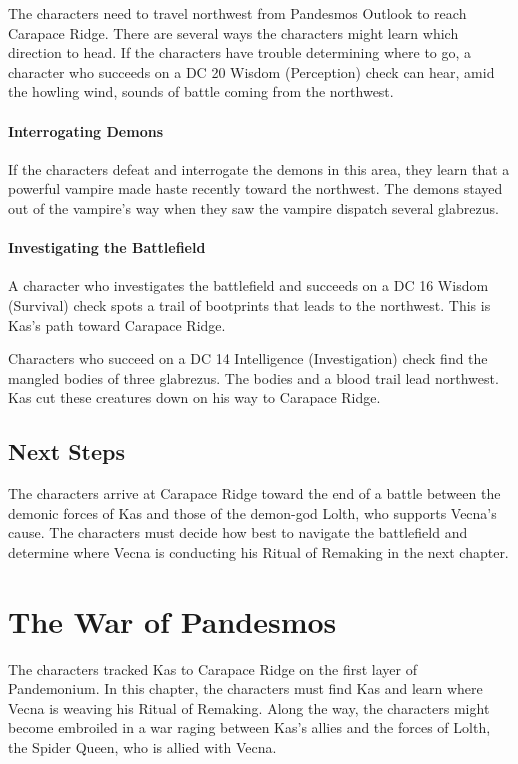 \documentclass[10pt,a4paper,twoside,bg=print,twocolumn,openany,nodeprecatedcode]{dndbook}
\begin{document}
The characters need to travel northwest from Pandesmos Outlook to reach Carapace Ridge. There are several ways the characters might learn which direction to head. If the characters have trouble determining where to go, a character who succeeds on a DC 20 Wisdom (Perception) check can hear, amid the howling wind, sounds of battle coming from the northwest.

\subsubsection{Interrogating Demons}
If the characters defeat and interrogate the demons in this area, they learn that a powerful vampire made haste recently toward the northwest. The demons stayed out of the vampire's way when they saw the vampire dispatch several glabrezus.

\subsubsection{Investigating the Battlefield}
A character who investigates the battlefield and succeeds on a DC 16 Wisdom (Survival) check spots a trail of bootprints that leads to the northwest. This is Kas's path toward Carapace Ridge.

Characters who succeed on a DC 14 Intelligence (Investigation) check find the mangled bodies of three glabrezus. The bodies and a blood trail lead northwest. Kas cut these creatures down on his way to Carapace Ridge.

\section{Next Steps}
The characters arrive at Carapace Ridge toward the end of a battle between the demonic forces of Kas and those of the demon-god Lolth, who supports Vecna's cause. The characters must decide how best to navigate the battlefield and determine where Vecna is conducting his Ritual of Remaking in the next chapter.

\chapter{The War of Pandesmos}
The characters tracked Kas to Carapace Ridge on the first layer of Pandemonium. In this chapter, the characters must find Kas and learn where Vecna is weaving his Ritual of Remaking. Along the way, the characters might become embroiled in a war raging between Kas's allies and the forces of Lolth, the Spider Queen, who is allied with Vecna.
\end{document}
